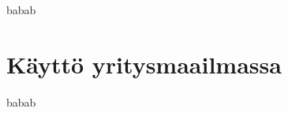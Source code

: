\documentclass[finnish]{tktltiki2}
\theoremstyle{definition}
\theoremstyle{remark}
\begin{document}
babab

\section{Käyttö yritysmaailmassa}


babab





%
%
% 
%









% 
\end{document}
